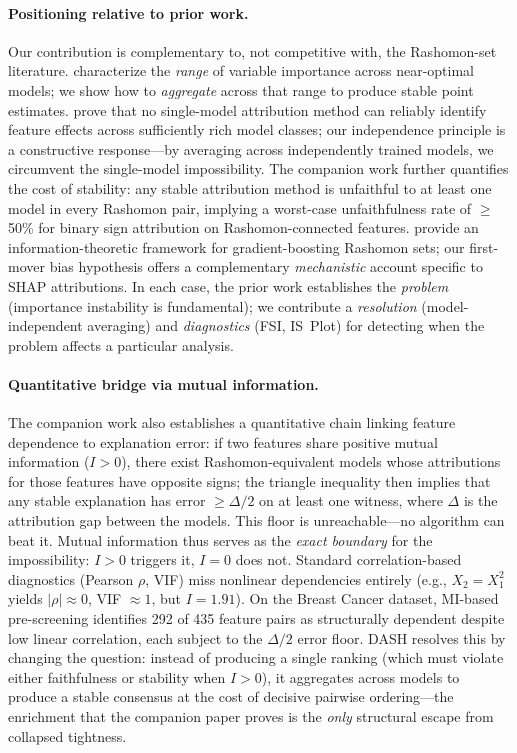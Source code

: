 \documentclass[11pt]{article}
\newcommand{\dash}{\textsc{DASH}}
\newcommand{\rhovar}{\rho}
\begin{document}
\paragraph{Positioning relative to prior work.}
Our contribution is complementary to, not competitive with, the
Rashomon-set literature.  \citet{fisher2019all} characterize the
\emph{range} of variable importance across near-optimal models; we show
how to \emph{aggregate} across that range to produce stable point
estimates.  \citet{bilodeau2024impossibility} prove that no
single-model attribution method can reliably identify feature effects
across sufficiently rich model classes; our independence principle is a
constructive response---by averaging across independently trained
models, we circumvent the single-model impossibility.
The companion work further quantifies the cost of stability: any
stable attribution method is unfaithful to at least one model in every
Rashomon pair, implying a worst-case unfaithfulness rate of
$\geq$50\% for binary sign attribution on Rashomon-connected features.
\citet{chenrashomongb2024} provide an information-theoretic framework
for gradient-boosting Rashomon sets; our first-mover bias hypothesis
offers a complementary \emph{mechanistic} account specific to SHAP
attributions.  In each case, the prior work establishes the
\emph{problem} (importance instability is fundamental); we contribute a
\emph{resolution} (model-independent averaging) and \emph{diagnostics}
(FSI, IS~Plot) for detecting when the problem affects a particular
analysis.

\paragraph{Quantitative bridge via mutual information.}
The companion work also establishes a quantitative chain linking feature
dependence to explanation error: if two features share positive mutual
information ($I > 0$), there exist Rashomon-equivalent models whose
attributions for those features have opposite signs; the triangle
inequality then implies that any stable explanation has error
$\geq \Delta/2$ on at least one witness, where $\Delta$ is the
attribution gap between the models.  This floor is unreachable---no
algorithm can beat it.  Mutual information thus serves as the
\emph{exact boundary} for the impossibility: $I > 0$ triggers it,
$I = 0$ does not.  Standard correlation-based diagnostics (Pearson
$\rhovar$, VIF) miss nonlinear dependencies entirely (e.g., $X_2 =
X_1^2$ yields $|\rhovar| \approx 0$, VIF $\approx 1$, but $I = 1.91$).
On the Breast Cancer dataset, MI-based pre-screening identifies 292 of
435 feature pairs as structurally dependent despite low linear
correlation, each subject to the $\Delta/2$ error floor.
\dash{} resolves this by changing the question: instead of producing a
single ranking (which must violate either faithfulness or stability when
$I > 0$), it aggregates across models to produce a stable consensus
at the cost of decisive pairwise ordering---the enrichment that the
companion paper proves is the \emph{only} structural escape from
collapsed tightness.
\end{document}
